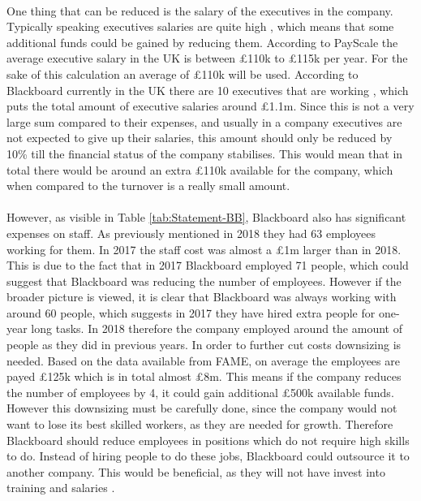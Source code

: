 \documentclass[]{article}
\begin{document}
\paragraph{}
One thing that can be reduced is the salary of the executives in the company. Typically speaking executives salaries are quite high \cite{Executives}, which means that some additional funds could be gained by reducing them. According to PayScale \cite{Executives-avg-salary} the average executive salary in the UK is between £110k to £115k per year. For the sake of this calculation an average of £110k will be used. According to Blackboard currently in the UK there are 10 executives that are working \cite{leaders-BB}, which puts the total amount of executive salaries around £1.1m. Since this is not a very large sum compared to their expenses, and usually in a company executives are not expected to give up their salaries, this amount should only be reduced by 10\% till the financial status of the company stabilises. This would mean that in total there would be around an extra £110k available for the company, which when compared to the turnover is a really small amount.

\paragraph{}
However, as visible in Table \ref{tab:Statement-BB}, Blackboard also has significant expenses on staff. As previously mentioned in 2018 they had 63 employees working for them. In 2017 the staff cost was almost a £1m larger than in 2018. This is due to the fact that in 2017 Blackboard employed 71 people, which could suggest that Blackboard was reducing the number of employees. However if the broader picture is viewed, it is clear that Blackboard was always working with around 60 people, which suggests in 2017 they have hired extra people for one-year long tasks. In 2018 therefore the company employed around the amount of people as they did in previous years. In order to further cut costs downsizing is needed. Based on the data available from FAME, on average the employees are payed £125k which is in total almost £8m. This means if the company reduces the number of employees by 4, it could gain additional £500k available funds. However this downsizing must be carefully done, since the company would not want to lose its best skilled workers, as they are needed for growth. Therefore Blackboard should reduce employees in positions which do not require high skills to do. Instead of hiring people to do these jobs, Blackboard could outsource it to another company. This would be beneficial, as they will not have invest into training and salaries \cite{forbes-outsourcing}. 
\end{document}
